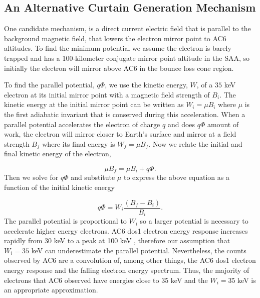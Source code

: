 \documentclass[draft]{agujournal2019}
\begin{document}
\subsection{An Alternative Curtain Generation Mechanism}
 One candidate mechanism,  is a direct current electric field that is parallel to the background magnetic field, that lowers the electron mirror point to AC6 altitudes. To find the minimum potential we assume the electron is barely trapped and has a 100-kilometer conjugate mirror point altitude in the SAA, so initially the electron will mirror above AC6 in the bounce loss cone region. 

To find the parallel potential, $q \Phi$,  we use the kinetic energy, $W$, of a $35$ keV electron at its initial mirror point with a magnetic field strength of $B_i$. The kinetic energy at the initial mirror point can be written as $W_i = \mu B_i$ where $\mu$ is the first adiabatic invariant that is conserved during this acceleration. When a parallel potential accelerates the electron of charge $q$ and does $q \Phi$ amount of work, the electron will mirror closer to Earth's surface and mirror at a field strength $B_f$ where its final energy is $W_f = \mu B_f$. Now we relate the initial and final kinetic energy of the electron,

\begin{equation}
\mu B_f = \mu B_i + q \Phi.
\end{equation} Then we solve for $q \Phi$ and substitute $\mu$ to express the above equation as a function of the initial kinetic energy 

\begin{equation}
 q \Phi = W_i \frac{(B_f - B_i)}{B_i}.
\end{equation} The parallel potential is proportional to $W_i$ so a larger potential is necessary to accelerate higher energy electrons. AC6 dos1 electron energy response increases rapidly from 30 keV to a peak at 100 keV \cite<Figure 2 in>{O'brien2019}, therefore our assumption that $W_i = 35$ keV can underestimate the parallel potential. Nevertheless, the counts observed by AC6 are a convolution of, among other things, the AC6 dos1 electron energy response and the falling electron energy spectrum. Thus, the majority of electrons that AC6 observed have energies close to 35 keV and the $W_i = 35$ keV is an appropriate approximation.
\end{document}
